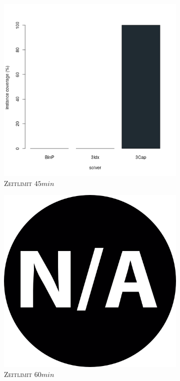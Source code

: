 \begin{figure}[H]
\begin{subfigure}[b]{0.3\textwidth}
\includegraphics[width=1.2\textwidth]{img/solver_instance_coverage_b=3_l_2700s.png}
\caption{\textsc{Zeitlimit} $45min$}
\label{fig:instance_coverage_b=3_l_b}
\end{subfigure}
\hfill
\begin{subfigure}[b]{0.3\textwidth}
\centering
\includegraphics[width=1.2\textwidth]{img/na.png}
\caption{\textsc{Zeitlimit} $60min$}
\label{fig:instance_coverage_b=3_l_c}
\end{subfigure}

\caption{}
\label{}
\end{figure}

